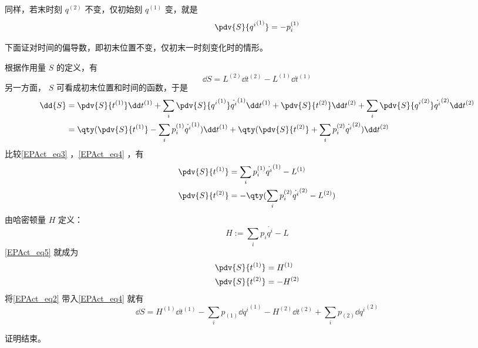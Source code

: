 同样，若末时刻 $q^{(2)}$ 不变，仅初始刻 $q^{(1)}$ 变，就是
\begin{equation}
\pdv{S}{{q^i}^{(1)}}=-p_i^{(1)}
\end{equation}

下面证对时间的偏导数，即初末位置不变，仅初末一时刻变化时的情形。

根据作用量 $S$ 的定义，有
\begin{equation}\label{EPAct_eq3}
\dd{S}=L^{(2)}\dd t^{(2)}-L^{(1)}\dd t^{(1)}
\end{equation}
另一方面， $S$ 可看成初末位置和时间的函数，于是
\begin{equation}\label{EPAct_eq4}
\begin{aligned}
\dd{S}&=\pdv{S}{t^{(1)}}\dd t^{(1)}+\sum_i\pdv{S}{{q^i}^{(1)}}\dot {q^i}^{(1)}\dd t^{(1)}+\pdv{S}{t^{(2)}}\dd t^{(2)}+\sum_i\pdv{S}{{q^i}^{(2)}}\dot {q^i}^{(2)}\dd t^{(2)}\\
&=\qty(\pdv{S}{t^{(1)}}-\sum_i p_i^{(1)}\dot {q^i}^{(1)})\dd t^{(1)}+\qty(\pdv{S}{t^{(2)}}+\sum_i p_i^{(2)}\dot {q^i}^{(2)})\dd t^{(2)}
\end{aligned}
\end{equation}
比较\autoref{EPAct_eq3} ，\autoref{EPAct_eq4} ，有
\begin{equation}\label{EPAct_eq5}
\begin{aligned}
\pdv{S}{t^{(1)}}&=\sum_i p_i^{(1)}\dot {q^i}^{(1)}-L^{(1)}\\
\pdv{S}{t^{(2)}}&=-\qty(\sum_i p_i^{(2)}\dot {q^i}^{(2)}-L^{(2)})
\end{aligned}
\end{equation}
由哈密顿量 $H$ 定义：
\begin{equation}
H:=\sum_i p_i\dot {q^i}-L
\end{equation}
\autoref{EPAct_eq5} 就成为
\begin{equation}\label{EPAct_eq2}
\begin{aligned}
\pdv{S}{t^{(1)}}&=H^{(1)}\\
\pdv{S}{t^{(2)}}&=-H^{(2)}
\end{aligned}
\end{equation}
将\autoref{EPAct_eq2} 带入\autoref{EPAct_eq4} 就有
\begin{equation}
\dd{S}=H^{(1)}\dd t^{(1)}-\sum_ip_{(1)}\dd {q^i}^{(1)}-H^{(2)}\dd t^{(2)}+\sum_i p_{(2)}\dd {q^i}^{(2)}
\end{equation}

证明结束。